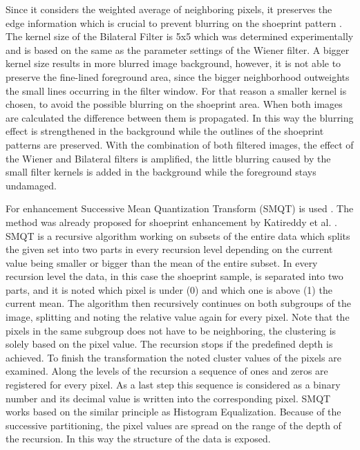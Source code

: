 \documentclass[draft,final]{vutinfth} %
\begin{document}
Since it considers the weighted average of neighboring pixels, it preserves the edge information which is crucial to prevent blurring on the shoeprint pattern \cite{elad2002origin}. 
The kernel size of the Bilateral Filter is 5x5 which was determined experimentally and is based on the same as the parameter settings of the Wiener filter.
A bigger kernel size results in more blurred image background, however, it is not able to preserve the fine-lined foreground area, since the bigger neighborhood outweights the small lines occurring in the filter window.
For that reason a smaller kernel is chosen, to avoid the possible blurring on the shoeprint area.
When both images are calculated the difference between them is propagated.
In this way the blurring effect is strengthened in the background while the outlines of the shoeprint patterns are preserved.
With the combination of both filtered images, the effect of the Wiener and Bilateral filters is amplified, the little blurring caused by the small filter kernels is added in the background while the foreground stays undamaged.
\par
For enhancement Successive Mean Quantization Transform (SMQT) is used \cite{nilsson2013smqt}.
The method was already proposed for shoeprint enhancement by Katireddy et al. \cite{katireddy2017novel}.
SMQT is a recursive algorithm working on subsets of the entire data which splits the given set into two parts in every recursion level depending on the current value being smaller or bigger than the mean of the entire subset.
In every recursion level the data, in this case the shoeprint sample, is separated into two parts, and it is noted which pixel is under (0) and which one is above (1) the current mean.
The algorithm then recursively continues on both subgroups of the image, splitting and noting the relative value again for every pixel.
Note that the pixels in the same subgroup does not have to be neighboring, the clustering is solely based on the pixel value.
The recursion stops if the predefined depth is achieved.
To finish the transformation the noted cluster values of the pixels are examined.
Along the levels of the recursion a sequence of ones and zeros are registered for every pixel.
As a last step this sequence is considered as a binary number and its decimal value is written into the corresponding pixel.
SMQT works based on the similar principle as Histogram Equalization.
Because of the successive partitioning, the pixel values are spread on the range of the depth of the recursion.
In this way the structure of the data is exposed.
\par
\end{document}
